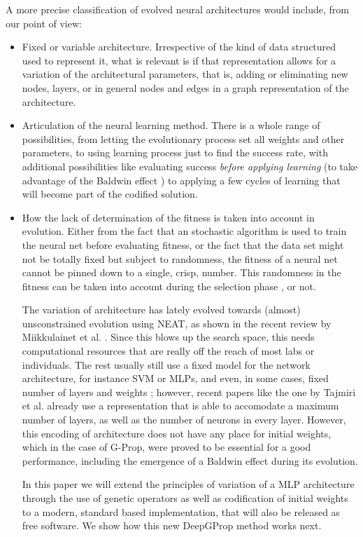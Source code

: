 \documentclass[runningheads]{llncs}
\begin{document}
A more precise classification of evolved neural architectures would include, from our point of
view: \begin{itemize}
  \item Fixed or variable architecture. Irrespective of the kind of
    data structured used to represent it, what is relevant is if that
    representation allows for a variation of the architectural
    parameters, that is, adding or eliminating new nodes, layers, or
    in general nodes and edges in a graph representation of the
    architecture.
  \item Articulation of the neural learning method. There is a whole
    range of possibilities, from letting the evolutionary process set
    all weights and other parameters, to using learning process just
    to find the success rate, with additional possibilities like
    evaluating success {\em before applying learning} (to take
    advantage of the Baldwin effect \cite{castillo-2006}) to applying
    a few cycles of learning that will become part of the codified
    solution.
  \item How the lack of determination of the fitness is taken into account 
    in evolution. Either from the fact that an stochastic algorithm is
    used to train the neural net before evaluating fitness, or the
    fact that the data set might not be totally fixed but subject to
    randomness, the fitness of a neural net cannot be pinned down to a
    single, crisp, number. This randomness in the fitness can be taken
    into account during the selection phase
    \cite{DBLP:conf/ijcci/MereloLFGCCRMG15}, or not.
    

The variation of architecture has lately evolved towards (almost)
unsconstrained evolution using NEAT, as shown in the recent review by
Miikkulainet et al. \cite{miikkulainen2019evolving}. Since this blows
up the search space, this needs computational resources that are
really off the reach of most labs or individuals. The rest usually
still use a fixed model for the network architecture, for instance SVM
or MLPs, and even, in some cases, fixed number of layers and weights
\cite{ecer2020training}; however, recent papers like the one by
Tajmiri et al. \cite{TAJMIRI2020108997} already use a representation
that is able to accomodate a maximum number of layers, as well as the
number of neurons in every layer. However, this encoding of
architecture does not have any place for initial weights, which in the
case of G-Prop, were proved to be essential for a good performance,
including the emergence of a Baldwin effect \cite{castillo-2006}
during its evolution.

In this paper we will extend the principles of variation of a MLP
architecture through the use of genetic operators as well as
codification of initial weights to a modern, standard based
implementation, that will also be released as free software. We show
how this new DeepGProp method works next.

\end{itemize}
\end{document}
